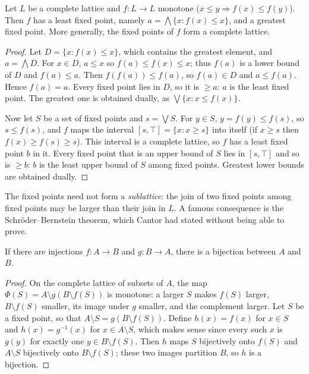 \begin{theorem}\label{orders:thm:tarski}
Let $L$ be a complete lattice and $f\colon L\to L$ monotone ($x\le y\Rightarrow f(x)\le f(y)$). Then $f$ has a least fixed point, namely
$a=\bigwedge\{x:f(x)\le x\}$, and a greatest fixed point. More generally, the fixed points of $f$ form a complete lattice.
\end{theorem}
\begin{proof}
Let $D=\{x:f(x)\le x\}$, which contains the greatest element, and $a=\bigwedge D$. For $x\in D$, $a\le x$ so $f(a)\le f(x)\le x$; thus $f(a)$ is a lower bound
of $D$ and $f(a)\le a$. Then $f(f(a))\le f(a)$, so $f(a)\in D$ and $a\le f(a)$. Hence $f(a)=a$. Every fixed point lies in $D$, so it is $\ge a$: $a$ is the
least fixed point. The greatest one is obtained dually, as $\bigvee\{x:x\le f(x)\}$.

Now let $S$ be a set of fixed points and $s=\bigvee S$. For $y\in S$, $y=f(y)\le f(s)$, so $s\le f(s)$, and $f$ maps the interval $[s,\top]=\{x:x\ge s\}$
into itself (if $x\ge s$ then $f(x)\ge f(s)\ge s$). This interval is a complete lattice, so $f$ has a least fixed point $b$ in it. Every
fixed point that is an upper bound of $S$ lies in $[s,\top]$ and so is $\ge b$: $b$ is the least upper bound of $S$ among fixed points.
Greatest lower bounds are obtained dually.
\end{proof}

The fixed points need not form a \emph{sublattice}: the join of two fixed points among fixed points may be larger than their
join in $L$. A famous consequence is the Schr\"oder--Bernstein theorem, which Cantor had stated without being able to prove.

\begin{corollary}\label{orders:cor:sb}
If there are injections $f\colon A\to B$ and $g\colon B\to A$, there is a bijection between $A$ and $B$.
\end{corollary}
\begin{proof}
On the complete lattice of subsets of $A$, the map $\Phi(S)=A\setminus g(B\setminus f(S))$ is monotone: a larger $S$ makes $f(S)$ larger, $B\setminus f(S)$
smaller, its image under $g$ smaller, and the complement larger. Let $S$ be a fixed point, so that $A\setminus S=g(B\setminus f(S))$. Define $h(x)=f(x)$ for
$x\in S$ and $h(x)=g^{-1}(x)$ for $x\in A\setminus S$, which makes sense since every such $x$ is $g(y)$ for exactly one $y\in B\setminus f(S)$. Then $h$ maps $S$
bijectively onto $f(S)$ and $A\setminus S$ bijectively onto $B\setminus f(S)$; these two images partition $B$, so $h$ is a bijection.
\end{proof}

